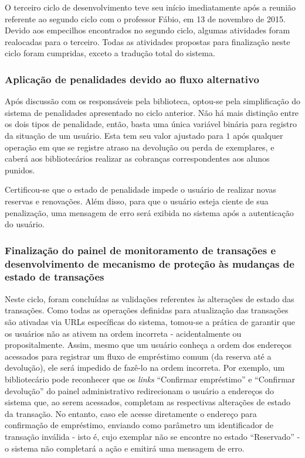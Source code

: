 \documentclass[a4paper]{article}
\begin{document}
O terceiro ciclo de desenvolvimento teve seu início imediatamente após a reunião referente ao segundo ciclo com o professor Fábio, em 13 de novembro de 2015. Devido aos empecilhos encontrados no segundo ciclo, algumas atividades foram realocadas para o terceiro. Todas as atividades propostas para finalização neste ciclo foram cumpridas, exceto a tradução total do sistema.

\subsubsection{Aplicação de penalidades devido ao fluxo alternativo}
    
Após discussão com os responsáveis pela biblioteca, optou-se pela simplificação do sistema de penalidades apresentado no ciclo anterior. Não há mais distinção entre os dois tipos de penalidade, então, basta uma única variável binária para registro da situação de um usuário. Esta tem seu valor ajustado para $1$ após qualquer operação em que se registre atraso na devolução ou perda de exemplares, e caberá aos bibliotecários realizar as cobranças correspondentes aos alunos punidos.
    
Certificou-se que o estado de penalidade impede o usuário de realizar novas reservas e renovações. Além disso, para que o usuário esteja ciente de sua penalização, uma mensagem de erro será exibida no sistema após a autenticação do usuário. 

\subsubsection{Finalização do painel de monitoramento de transações e desenvolvimento de mecanismo de proteção às mudanças de estado de transações}
    
Neste ciclo, foram concluídas as validações referentes às alterações de estado das transações. Como todas as operações definidas para atualização das transações são ativadas via URLs específicas do sistema, tomou-se a prática de garantir que os usuários não as ativem na ordem incorreta - acidentalmente ou propositalmente. Assim, mesmo que um usuário conheça a ordem dos endereços acessados para registrar um fluxo de empréstimo comum (da reserva até a devolução), ele será impedido de fazê-lo na ordem incorreta. Por exemplo, um bibliotecário pode reconhecer que os \textit{links} “Confirmar empréstimo” e “Confirmar devolução” do painel administrativo redirecionam o usuário a endereços do sistema que, ao serem acessados, completam as respectivas alterações de estado da transação. No entanto, caso ele acesse diretamente o endereço para confirmação de empréstimo, enviando como parâmetro um identificador de transação inválida - isto é, cujo exemplar não se encontre no estado “Reservado” - o sistema não completará a ação e emitirá uma mensagem de erro.
\end{document}
